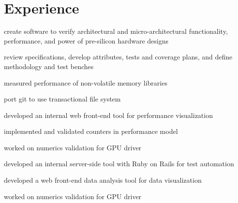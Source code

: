 \documentclass[]{deedy-resume-openfont}
\begin{document}
\begin{minipage}[t]{0.66\textwidth}


\section{Experience}

\vspace{\topsep} %
\begin{tightemize}
\item create software to verify architectural and micro-architectural functionality,
    performance, and power of pre-silicon hardware designs
\item review specifications, develop attributes, tests and coverage plans, and define
    methodology and test benches
\end{tightemize}
\sectionsep

\begin{tightemize}
\item measured performance of non-volatile memory libraries
\item port git to use transactional file system
\end{tightemize}
\sectionsep

\begin{tightemize}
\item developed an internal web front-end tool for performance visualization
\item implemented and validated counters in performance model
\item worked on numerics validation for GPU driver
\end{tightemize}
\sectionsep

\begin{tightemize}
\item developed an internal server-side tool with Ruby on Rails for test automation
\item developed a web front-end data analysis tool for data visualization
\item worked on numerics validation for GPU driver
\end{tightemize}
\sectionsep


\end{minipage}
\end{document}
